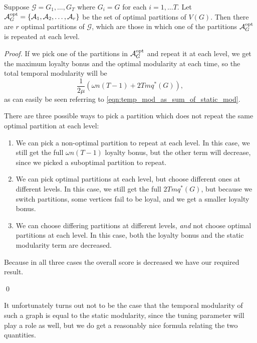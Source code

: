 \documentclass[runningheads]{llncs}
\newcommand{\cA}{\mathcal{A}}
\newcommand{\cG}{\mathcal{G}}
\begin{document}
\begin{lemma}
    Suppose $\cG=G_1, \ldots, G_T$ where $G_i=G$ for each $i=1, \ldots T$. Let $\mathcal{A}^{\rm opt}_G = \{ \cA_1, \cA_2, \ldots, \cA_r \}$ be the set of optimal partitions of $V(G)$. Then there are $r$ optimal partitions of $\cG$, which are those in which one of the partitions $\mathcal{A}^{\rm opt}_G$ is repeated at each level.
\end{lemma}
\begin{proof}
    If we pick one of the partitions in $\cA^{\rm opt}_G$ and repeat it at each level, we get the maximum loyalty bonus and the optimal modularity at each time, so the total temporal modularity will be
    $$\frac{1}{2\mu}\left(\omega n(T-1) + 2Tmq^*(G)\right),$$
    as can easily be seen referring to \eqref{eqn:temp_mod_as_sum_of_static_mod}.

    There are three possible ways to pick a partition which does not repeat the same optimal partition at each level:
    \begin{enumerate}
        \item We can pick a non-optimal partition to repeat at each level. In this case, we still get the full $\omega n(T-1)$ loyalty bonus, but the other term will decrease, since we picked a suboptimal partition to repeat.
        \item We can pick optimal partitions at each level, but choose different ones at different levels. In this case, we still get the full $2Tmq^*(G)$, but because we switch partitions, some vertices fail to be loyal, and we get a smaller loyalty bonus.
        \item We can choose differing partitions at different levels, \emph{and} not choose optimal partitions at each level. In this case, both the loyalty bonus and the static modularity term are decreased.
    \end{enumerate}

Because in all three cases the overall score is decreased we have our required result.  
    
    \qed
\end{proof}

It unfortunately turns out not to be the case that the temporal modularity of such a graph is equal to the static modularity, since the tuning parameter will play a role as well, but we do get a reasonably nice formula relating the two quantities.
\end{document}
